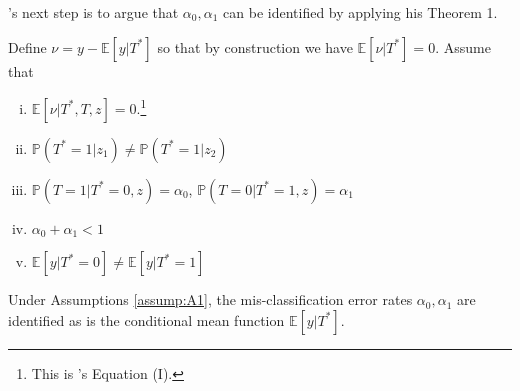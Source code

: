 \citeauthor{Mahajan}'s next step is to argue that $\alpha_0,\alpha_1$ can be identified by applying his Theorem 1.
\begin{assump}[Mahajan A1] Define $\nu = y - \mathbb{E}[y|T^*]$ so that by construction we have $\mathbb{E}[\nu|T^*]=0$. Assume that
  \label{assump:A1}
  \begin{enumerate}[(i)]
    \item $\mathbb{E}[\nu|T^*,T,z] = 0$.\footnote{This is \citeauthor{Mahajan}'s Equation (I).}
    \item $\mathbb{P}(T^*=1|z_1)\neq \mathbb{P}(T^*=1|z_2)$
    \item $\mathbb{P}(T = 1| T^* = 0, z) = \alpha_0$,  $\mathbb{P}(T = 0| T^* = 1, z) = \alpha_1$
    \item $\alpha_0 + \alpha_1 < 1$
    \item $\mathbb{E}[y|T^*=0]\neq \mathbb{E}[y|T^*=1]$
  \end{enumerate}
\end{assump}
\begin{thm}
  \label{thm:1}
  Under Assumptions \ref{assump:A1}, the mis-classification error rates $\alpha_0, \alpha_1$ are identified as is the conditional mean function $\mathbb{E}[y|T^*]$.
\end{thm}

